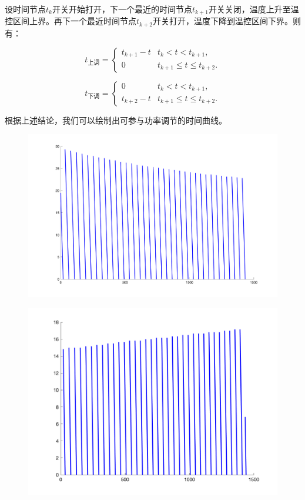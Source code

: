 \documentclass[withoutpreface,bwprint]{cumcmthesis} %
\begin{document}
设时间节点$t_k$开关开始打开，下一个最近的时间节点$t_{k+1}$开关关闭，温度上升至温控区间上界。再下一个最近时间节点$t_{k+2}$开关打开，温度下降到温控区间下界。则有：

 \[ t_{\mbox{上调}}= \left\{
  \begin{array}{rl}
t_{k+1}-t & t_k< t <t_{k+1},\\
 0 & t_{k+1}\leq  t \leq t_{k+2} .
 \end{array} \right. \]
 
  \[ t_{\mbox{下调}}= \left\{
  \begin{array}{rl}
0 & t_k< t <t_{k+1},\\
 t_{k+2}-t & t_{k+1}\leq  t \leq t_{k+2} .
 \end{array} \right. \]

根据上述结论，我们可以绘制出可参与功率调节的时间曲线。
\begin{figure}[H]
    \centering
    \begin{minipage}[c]{0.49\textwidth}
        \includegraphics[width=1\textwidth]{figures/2-1-up.png}
    \label{fig:my_label}
    \end{minipage}
\begin{minipage}[c]{0.45\textwidth}
    \includegraphics[width=1\textwidth]{figures/2-1-down.png}
    \label{fig:my_label}
\end{minipage}
\end{figure}
\end{document}
